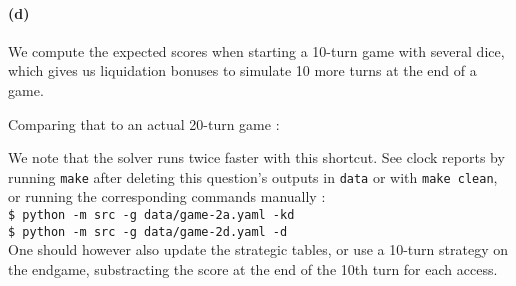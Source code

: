 \documentclass{article}
\newcommand{\getoutput}[1]{}
\begin{document}
    \paragraph{(d)}
    We compute the expected scores when starting a 10-turn game with several dice,
    which gives us liquidation bonuses to simulate 10 more turns at the end of a game.
    \getoutput{2d1}
    Comparing that to an actual 20-turn game :
    \getoutput{2d}
    We note that the solver runs twice faster with this shortcut.
    See clock reports by running \texttt{make} after deleting this question's outputs in
    \texttt{data} or with \texttt{make clean},
    or running the corresponding commands manually :\\
    \texttt{\$ python -m src -g data/game-2a.yaml -kd}\\
    \texttt{\$ python -m src -g data/game-2d.yaml -d}\\
    One should however also update the strategic tables, or use a 10-turn strategy on the
    endgame, substracting the score at the end of the 10th turn for each access.
\end{document}
